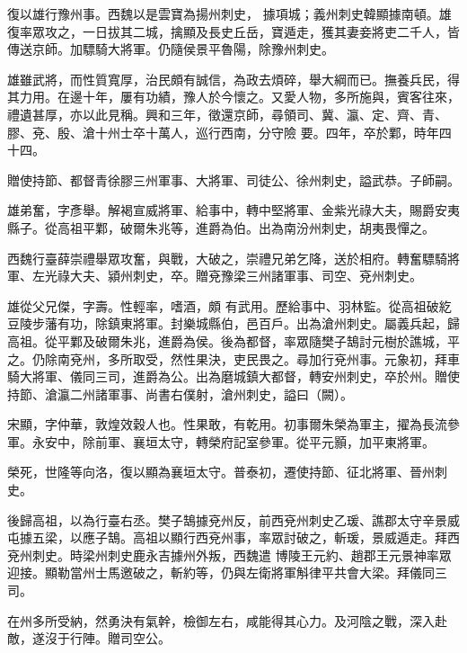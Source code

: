 \begin{pinyinscope}
 復以雄行豫州事。西魏以是雲寶為揚州刺史，
 據項城；義州刺史韓顯據南頓。雄復率眾攻之，一日拔其二城，擒顯及長史丘岳，寶遁走，獲其妻妾將吏二千人，皆傳送京師。加驃騎大將軍。仍隨侯景平魯陽，除豫州刺史。



 雄雖武將，而性質寬厚，治民頗有誠信，為政去煩碎，舉大綱而已。撫養兵民，得其力用。在邊十年，屢有功績，豫人於今懷之。又愛人物，多所施與，賓客往來，禮遺甚厚，亦以此見稱。興和三年，徵還京師，尋領司、冀、瀛、定、齊、青、膠、兗、殷、滄十州士卒十萬人，巡行西南，分守險
 要。四年，卒於鄴，時年四十四。



 贈使持節、都督青徐膠三州軍事、大將軍、司徒公、徐州刺史，謚武恭。子師嗣。



 雄弟奮，字彥舉。解褐宣威將軍、給事中，轉中堅將軍、金紫光祿大夫，賜爵安夷縣子。從高祖平鄴，破爾朱兆等，進爵為伯。出為南汾州刺史，胡夷畏憚之。



 西魏行臺薛崇禮舉眾攻奮，與戰，大破之，崇禮兄弟乞降，送於相府。轉奮驃騎將軍、左光祿大夫、潁州刺史，卒。贈兗豫梁三州諸軍事、司空、兗州刺史。



 雄從父兄傑，字壽。性輕率，嗜酒，頗
 有武用。歷給事中、羽林監。從高祖破紇豆陵步藩有功，除鎮東將軍。封樂城縣伯，邑百戶。出為滄州刺史。屬義兵起，歸高祖。從平鄴及破爾朱兆，進爵為侯。後為都督，率眾隨樊子鵠討元樹於譙城，平之。仍除南兗州，多所取受，然性果決，吏民畏之。尋加行兗州事。元象初，拜車騎大將軍、儀同三司，進爵為公。出為磨城鎮大都督，轉安州刺史，卒於州。贈使持節、滄瀛二州諸軍事、尚書右僕射，滄州刺史，謚曰（闕）。



 宋顯，字仲華，敦煌效穀人也。性果敢，有乾用。初事爾朱榮為軍主，擢為長流參軍。永安中，除前軍、襄垣太守，轉榮府記室參軍。從平元顥，加平東將軍。



 榮死，世隆等向洛，復以顯為襄垣太守。普泰初，遷使持節、征北將軍、晉州刺史。



 後歸高祖，以為行臺右丞。樊子鵠據兗州反，前西兗州刺史乙瑗、譙郡太守辛景威屯據五梁，以應子鵠。高祖以顯行西兗州事，率眾討破之，斬瑗，景威遁走。拜西兗州刺史。時梁州刺史鹿永吉據州外叛，西魏遣
 博陵王元約、趙郡王元景神率眾迎接。顯勒當州士馬邀破之，斬約等，仍與左衛將軍斛律平共會大梁。拜儀同三司。



 在州多所受納，然勇決有氣幹，檢御左右，咸能得其心力。及河陰之戰，深入赴敵，遂沒于行陣。贈司空公。




\end{pinyinscope}
